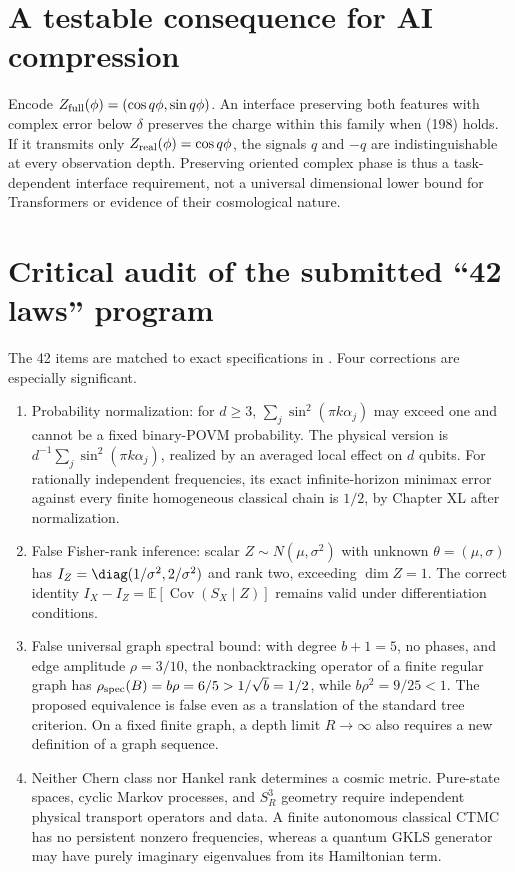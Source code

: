\documentclass[11pt,a4paper,oneside]{book}
\begin{document}
\section{A testable consequence for AI compression}
Encode $Z_{\rm full}(\phi)=(\cos q\phi,\sin q\phi)$. An interface preserving both features with complex error below $\delta$ preserves the charge within this family when (198) holds. If it transmits only $Z_{\rm real}(\phi)=\cos q\phi$, the signals $q$ and $-q$ are indistinguishable at every observation depth. Preserving oriented complex phase is thus a task-dependent interface requirement, not a universal dimensional lower bound for Transformers or evidence of their cosmological nature.
\section{Critical audit of the submitted ``42 laws'' program}
The 42 items are matched to exact specifications in . Four corrections are especially significant.
\begin{enumerate}
\item Probability normalization: for $d\ge3$, $\sum_j\sin^2(\pi k\alpha_j)$ may exceed one and cannot be a fixed binary-POVM probability. The physical version is $d^{-1}\sum_j\sin^2(\pi k\alpha_j)$, realized by an averaged local effect on $d$ qubits. For rationally independent frequencies, its exact infinite-horizon minimax error against every finite homogeneous classical chain is $1/2$, by Chapter XL after normalization.
\item False Fisher-rank inference: scalar $Z\sim N(\mu,\sigma^2)$ with unknown $\theta=(\mu,\sigma)$ has $I_Z=\diag(1/\sigma^2,2/\sigma^2)$ and rank two, exceeding $\dim Z=1$. The correct identity $I_X-I_Z=\mathbb E[\operatorname{Cov}(S_X\mid Z)]$ remains valid under differentiation conditions.
\item False universal graph spectral bound: with degree $b+1=5$, no phases, and edge amplitude $\rho=3/10$, the nonbacktracking operator of a finite regular graph has $\rho_{\rm spec}(B)=b\rho=6/5>1/\sqrt b=1/2$, while $b\rho^2=9/25<1$. The proposed equivalence is false even as a translation of the standard tree criterion. On a fixed finite graph, a depth limit $R\to\infty$ also requires a new definition of a graph sequence.
\item Neither Chern class nor Hankel rank determines a cosmic metric. Pure-state spaces, cyclic Markov processes, and $S_R^3$ geometry require independent physical transport operators and data. A finite autonomous classical CTMC has no persistent nonzero frequencies, whereas a quantum GKLS generator may have purely imaginary eigenvalues from its Hamiltonian term.
\end{enumerate}
\end{document}
